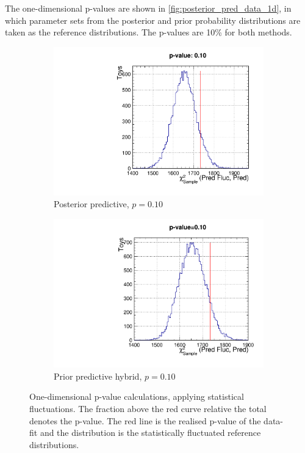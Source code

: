 The one-dimensional p-values are shown in \autoref{fig:posterior_pred_data_1d}, in which parameter sets from the posterior and prior probability distributions are taken as the reference distributions. The p-values are 10\% for both methods.
\begin{figure}[h]
	\begin{subfigure}[t]{0.49\textwidth}
		\includegraphics[width=\textwidth, trim={0mm 0mm 0mm 14mm}, clip,page=1]{figures/mach3/data/postpred/postpred_pvalue_1d}
		\caption{Posterior predictive, $p=0.10$}
	\end{subfigure}
	\begin{subfigure}[t]{0.49\textwidth}
		\includegraphics[width=\textwidth, trim={0mm 0mm 0mm 14mm}, clip,page=1]{figures/mach3/data/postpred/PriorPredictive_Hybrid}
		\caption{Prior predictive hybrid, $p=0.10$}
	\end{subfigure}
	\caption{One-dimensional p-value calculations, applying statistical fluctuations. The fraction above the red curve relative the total denotes the p-value. The red line is the realised p-value of the data-fit and the distribution is the statistically fluctuated reference distributions.}
	\label{fig:posterior_pred_data_1d}
\end{figure}


